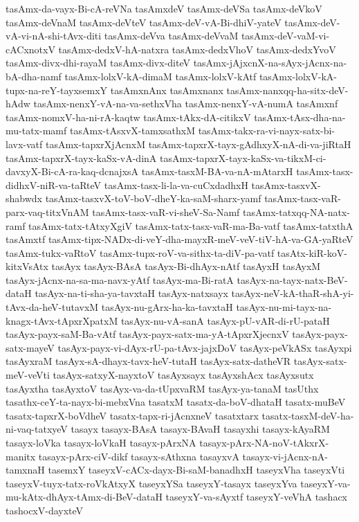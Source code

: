 {tasAmx-da-vayx-Bi-cA-reVNa
tasAmxdeV
tasAmx-deVSa
tasAmx-deVkoV
tasAmx-deVnaM
tasAmx-deVteV
tasAmx-deV-vA-Bi-dhiV-yateV
tasAmx-deV-vA-vi-nA-shi-tAvx-diti
tasAmx-deVva
tasAmx-deVvaM
tasAmx-deV-vaM-vi-cACxnotxV
tasAmx-dedxV-hA-natxra
tasAmx-dedxVhoV
tasAmx-dedxYvoV
tasAmx-divx-dhi-rayaM
tasAmx-divx-diteV
tasAmx-jAjxcnX-na-sAyx-jAcnx-na-bA-dha-namf
tasAmx-lolxV-kA-dimaM
tasAmx-lolxV-kAtf
tasAmx-lolxV-kA-tupx-na-reY-tayxsemxY
tasAmxnAnx
tasAmxnanx
tasAmx-nanxqq-ha-sitx-deV-hAdw
tasAmx-nenxY-vA-na-va-sethxVha
tasAmx-nenxY-vA-numA
tasAmxnf
tasAmx-nomxV-ha-ni-rA-kaqtw
tasAmx-tAkx-dA-citikxV
tasAmx-tAsx-dha-na-mu-tatx-mamf
tasAmx-tAsxvX-tamxsathxM
tasAmx-takx-ra-vi-nayx-satx-bi-lavx-vatf
tasAmx-tapxrXjAcnxM
tasAmx-tapxrX-tayx-gAdhxyX-nA-di-va-jiRtaH
tasAmx-tapxrX-tayx-kaSx-vA-dinA
tasAmx-tapxrX-tayx-kaSx-va-tikxM-ci-davxyX-Bi-cA-ra-kaq-dcnajxsA
tasAmx-tasxM-BA-va-nA-mAtarxH
tasAmx-tasx-didhxV-niR-va-taRteV
tasAmx-tasx-li-la-va-cuCxdadhxH
tasAmx-tasxvX-shabwdx
tasAmx-tasxvX-toV-boV-dheY-ka-saM-sharx-yamf
tasAmx-tasx-vaR-parx-vaq-titxVnAM
tasAmx-tasx-vaR-vi-sheV-Sa-Namf
tasAmx-tatxqq-NA-natx-ramf
tasAmx-tatx-tAtxyXgiV
tasAmx-tatx-tasx-vaR-ma-Ba-vatf
tasAmx-tatxthA
tasAmxtf
tasAmx-tipx-NADx-di-veY-dha-mayxR-meV-veV-tiV-hA-va-GA-yaRteV
tasAmx-tukx-vaRtoV
tasAmx-tupx-roV-va-sithx-ta-diV-pa-vatf
tasAtx-kiR-koV-kitxVsAtx
tasAyx
tasAyx-BAsA
tasAyx-Bi-dhAyx-nAtf
tasAyxH
tasAyxM
tasAyx-jAcnx-na-sa-ma-navx-yAtf
tasAyx-ma-Bi-ratA
tasAyx-na-tayx-natx-BeV-dataH
tasAyx-na-ti-sha-ya-tavxtaH
tasAyx-natxsayx
tasAyx-neV-kA-thaR-shA-yi-tAvx-da-heV-tutavxM
tasAyx-nu-gArx-ha-ka-tavxtaH
tasAyx-nu-mi-tayx-na-knagx-tAvx-tApxrXpatxM
tasAyx-nu-vA-sanA
tasAyx-pU-vAR-di-rU-pataH
tasAyx-payx-saM-Ba-vAtf
tasAyx-payx-satx-ma-yA-tApxrXjecnxV
tasAyx-payx-satx-mayeV
tasAyx-payx-vi-dAyx-rU-pa-tAvx-jajxDoV
tasAyx-peVkASx
tasAyxpi
tasAyxraM
tasAyx-sA-dhayx-tavx-heV-tutaH
tasAyx-satx-datheVR
tasAyx-satx-meV-veVti
tasAyx-satxyX-nayxtoV
tasAyxsayx
tasAyxshAcx
tasAyxsutx
tasAyxtha
tasAyxtoV
tasAyx-va-da-tUpxvaRM
tasAyx-ya-tanaM
tasUthx
tasathx-ceY-ta-nayx-bi-mebxVna
tasatxM
tasatx-da-boV-dhataH
tasatx-muBeV
tasatx-tapxrX-boVdheV
tasatx-tapx-ri-jAcnxneV
tasatxtarx
tasatx-tasxM-deV-ha-ni-vaq-tatxyeV
tasayx
tasayx-BAsA
tasayx-BAvaH
tasayxhi
tasayx-kAyaRM
tasayx-loVka
tasayx-loVkaH
tasayx-pArxNA
tasayx-pArx-NA-noV-tAkxrX-manitx
tasayx-pArx-ciV-dikf
tasayx-sAthxna
tasayxvA
tasayx-vi-jAcnx-nA-tamxnaH
tasemxY
taseyxV-cACx-dayx-Bi-saM-banadhxH
taseyxVha
taseyxVti
taseyxV-tuyx-tatx-roVkAtxyX
taseyxYSa
taseyxY-tasayx
taseyxYva
taseyxY-va-mu-kAtx-dhAyx-tAmx-di-BeV-dataH
taseyxY-va-sAyxtf
taseyxY-veVhA
tashacx
tashocxV-dayxteV
}
